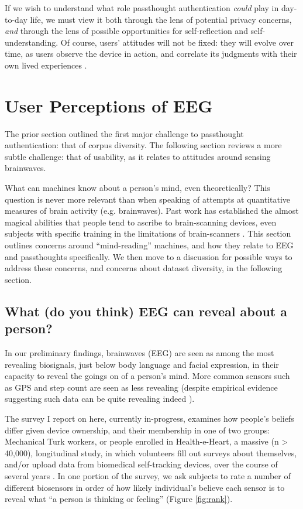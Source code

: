 \documentclass[sigconf]{acmart}
\begin{document}
If we wish to understand what role passthought authentication \emph{could} play in day-to-day life,
we must view it both through the lens of potential privacy concerns, \emph{and} through the lens of possible opportunities for self-reflection and self-understanding. 
Of course, users' attitudes will not be fixed: they will evolve over time, as users observe the device in action, and correlate its judgments with their own lived experiences \cite{Nafus2016}.

\section{User Perceptions of EEG}
\label{sec:org30e9f5a}

The prior section outlined the first major challenge to passthought authentication: that of corpus diversity.
The following section reviews a more subtle challenge: that of usability, as it relates to attitudes around sensing brainwaves.

What can machines know about a person's mind, even theoretically? 
This question is never more relevant than when speaking of attempts at quantitative measures of brain activity (e.g. brainwaves).
Past work has established the almost magical abilities that people tend to ascribe to brain-scanning devices, even subjects with specific training in the limitations of brain-scanners \cite{Ali2014a}.
This section outlines concerns around ``mind-reading'' machines, and how they relate to EEG and passthoughts specifically.
We then move to a discussion for possible ways to address these concerns, and concerns about dataset diversity, in the following section.

\subsection{What (do you think) EEG can reveal about a person?}
\label{sec:org4244390}

In our preliminary findings, brainwaves (EEG) are seen as among the most revealing biosignals, just below body language and facial expression, in their capacity to reveal the goings on of a person's mind. 
More common sensors such as GPS and step count are seen as less revealing (despite empirical evidence suggesting such data can be quite revealing indeed \cite{Canzian2015}).

The survey I report on here, currently in-progress, examines how people's beliefs differ given device ownership, and their membership in one of two groups: Mechanical Turk workers, or people enrolled in Health-e-Heart, a massive (n > 40,000), longitudinal study, in which volunteers fill out surveys about themselves, and/or upload data from biomedical self-tracking devices, over the course of several years \cite{Estrin2010a}.
In one portion of the survey, we ask subjects to rate a number of different biosensors in order of how likely individual's believe each sensor is to reveal what ``a person is thinking or feeling'' (Figure \ref{fig:rank}).
\end{document}
